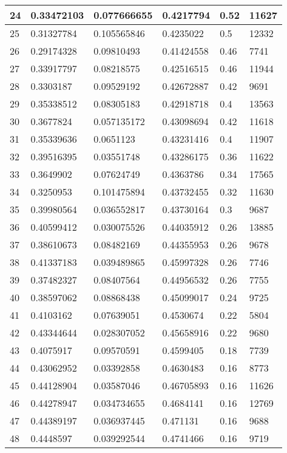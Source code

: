 \begin{longtable}{|l|l|l|l|l|l|}
24 & 0.33472103 & 0.077666655 & 0.4217794 & 0.52 & 11627 \\ \hline 
25 & 0.31327784 & 0.105565846 & 0.4235022 & 0.5 & 12332 \\ \hline 
26 & 0.29174328 & 0.09810493 & 0.41424558 & 0.46 & 7741 \\ \hline 
27 & 0.33917797 & 0.08218575 & 0.42516515 & 0.46 & 11944 \\ \hline 
28 & 0.3303187 & 0.09529192 & 0.42672887 & 0.42 & 9691 \\ \hline 
29 & 0.35338512 & 0.08305183 & 0.42918718 & 0.4 & 13563 \\ \hline 
30 & 0.3677824 & 0.057135172 & 0.43098694 & 0.42 & 11618 \\ \hline 
31 & 0.35339636 & 0.0651123 & 0.43231416 & 0.4 & 11907 \\ \hline 
32 & 0.39516395 & 0.03551748 & 0.43286175 & 0.36 & 11622 \\ \hline 
33 & 0.3649902 & 0.07624749 & 0.4363786 & 0.34 & 17565 \\ \hline 
34 & 0.3250953 & 0.101475894 & 0.43732455 & 0.32 & 11630 \\ \hline 
35 & 0.39980564 & 0.036552817 & 0.43730164 & 0.3 & 9687 \\ \hline 
36 & 0.40599412 & 0.030075526 & 0.44035912 & 0.26 & 13885 \\ \hline 
37 & 0.38610673 & 0.08482169 & 0.44355953 & 0.26 & 9678 \\ \hline 
38 & 0.41337183 & 0.039489865 & 0.45997328 & 0.26 & 7746 \\ \hline 
39 & 0.37482327 & 0.08407564 & 0.44956532 & 0.26 & 7755 \\ \hline 
40 & 0.38597062 & 0.08868438 & 0.45099017 & 0.24 & 9725 \\ \hline 
41 & 0.4103162 & 0.07639051 & 0.4530674 & 0.22 & 5804 \\ \hline 
42 & 0.43344644 & 0.028307052 & 0.45658916 & 0.22 & 9680 \\ \hline 
43 & 0.4075917 & 0.09570591 & 0.4599405 & 0.18 & 7739 \\ \hline 
44 & 0.43062952 & 0.03392858 & 0.4630483 & 0.16 & 8773 \\ \hline 
45 & 0.44128904 & 0.03587046 & 0.46705893 & 0.16 & 11626 \\ \hline 
46 & 0.44278947 & 0.034734655 & 0.4684141 & 0.16 & 12769 \\ \hline 
47 & 0.44389197 & 0.036937445 & 0.471131 & 0.16 & 9688 \\ \hline 
48 & 0.4448597 & 0.039292544 & 0.4741466 & 0.16 & 9719 \\ \hline 

\end{longtable}
